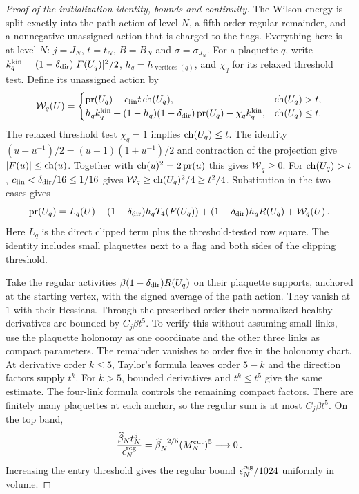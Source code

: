 \begin{proof}[Proof of the initialization identity, bounds and continuity]
The Wilson energy is split exactly into the path action of level $N$, a fifth-order regular remainder, and a nonnegative unassigned action that is charged to the flags. Everything here is at level $N$: $j=J_N$, $t=t_N$, $B=B_N$ and $\sigma=\sigma_{J_N}$. For a plaquette $q$, write $k_q^{\rm kin}=(1-\delta_{\rm dir})|F(U_q)|^2/2$, $h_q=h_{\operatorname{vertices}(q)}$, and $\chi_q$ for its relaxed threshold test. Define its unassigned action by
\begin{equation*}
\mathcal W_q(U)=\begin{cases}
\operatorname{pr}(U_q)-c_{\rm lin}t\operatorname{ch}(U_q),&\operatorname{ch}(U_q)>t,\\
h_q k_q^{\rm kin}+(1-h_q)(1-\delta_{\rm dir})\operatorname{pr}(U_q)-\chi_q k_q^{\rm kin},&\operatorname{ch}(U_q)\le t.
\end{cases}
\end{equation*}
The relaxed threshold test $\chi_q=1$ implies $\operatorname{ch}(U_q)\le t$. The identity $(u-u^{-1})/2=(u-1)(1+u^{-1})/2$ and contraction of the projection give $|F(u)|\le\operatorname{ch}(u)$. Together with $\operatorname{ch}(u)^2=2\operatorname{pr}(u)$ this gives $\mathcal W_q\ge0$. For $\operatorname{ch}(U_q)>t$, $c_{\rm lin}<\delta_{\rm dir}/16\le1/16$ gives $\mathcal W_q\ge\operatorname{ch}(U_q)^2/4\ge t^2/4$. Substitution in the two cases gives
\begin{equation}\label{eq:D-start-identity}
\operatorname{pr}(U_q)=L_q(U)+(1-\delta_{\rm dir})h_qT_4(F(U_q))
+(1-\delta_{\rm dir})h_qR(U_q)+\mathcal W_q(U)\,.
\end{equation}
Here $L_q$ is the direct clipped term plus the threshold-tested row square. The identity includes small plaquettes next to a flag and both sides of the clipping threshold.

Take the regular activities $\beta(1-\delta_{\rm dir})R(U_q)$ on their plaquette supports, anchored at the starting vertex, with the signed average of the path action. They vanish at $1$ with their Hessians. Through the prescribed order their normalized healthy derivatives are bounded by $C_j\beta t^5$. To verify this without assuming small links, use the plaquette holonomy as one coordinate and the other three links as compact parameters. The remainder vanishes to order five in the holonomy chart. At derivative order $k\le5$, Taylor's formula leaves order $5-k$ and the direction factors supply $t^k$. For $k>5$, bounded derivatives and $t^k\le t^5$ give the same estimate. The four-link formula controls the remaining compact factors. There are finitely many plaquettes at each anchor, so the regular sum is at most $C_j\beta t^5$. On the top band,
\begin{equation*}
\frac{\widehat{\beta}_Nt_N^5}{\epsilon_N^{\rm reg}}
=\widehat{\beta}_N^{-2/5}(M^{\mathrm{cut}}_N)^5\longrightarrow0\,.
\end{equation*}
Increasing the entry threshold gives the regular bound $\epsilon_N^{\rm reg}/1024$ uniformly in volume.


\end{proof}
